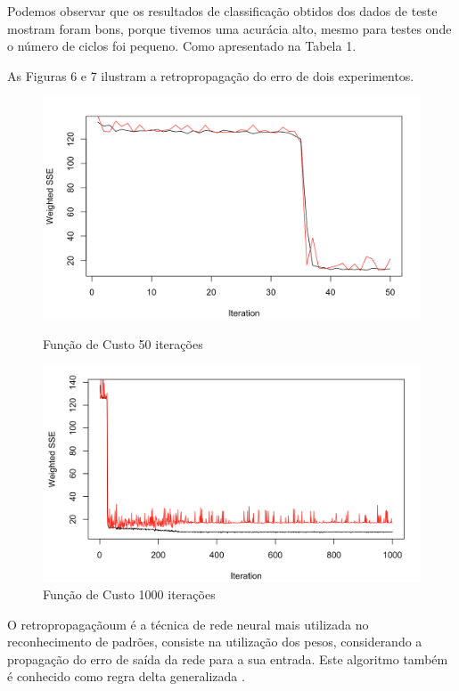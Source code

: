 \documentclass[conference]{IEEEtran}
\begin{document}
    Podemos observar que os resultados de classificação obtidos dos dados de teste mostram foram bons, porque tivemos uma acurácia alto, mesmo para testes onde o número de ciclos foi pequeno. Como apresentado na Tabela 1.
    
    As Figuras 6 e 7 ilustram a retropropagação do erro de dois experimentos.
    
    \begin{figure}[htbp]
	\centerline{\includegraphics[scale=0.35]{imagens/9,8,8,5,3-50.png}}
	\caption{Função de Custo 50 iterações}
	
	\centerline{\includegraphics[scale=0.35]{imagens/9,8,8,5,3-1000.png}}
	\caption{Função de Custo 1000 iterações}
	\label{fig}
	\end{figure}
	
	 O retropropagaçãoum é a técnica de rede neural mais utilizada no reconhecimento de padrões, consiste na utilização dos pesos, considerando a propagação do erro de saída da rede para a sua entrada. Este algoritmo também é conhecido como regra delta generalizada \cite{b12} \cite{b13}. 
	
\end{document}
